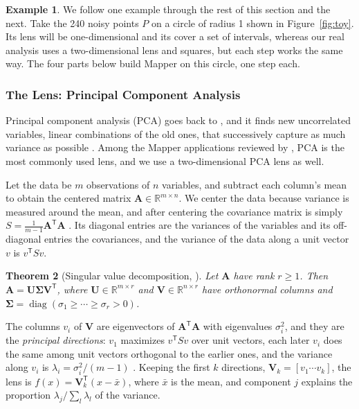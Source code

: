 \documentclass[11pt]{article}
\newcommand{\R}{\mathbb{R}}
\newtheorem{theorem}{Theorem}[section]
\theoremstyle{definition}
\newtheorem{example}[theorem]{Example}
\theoremstyle{remark}
\begin{document}
\begin{example}\label{ex:toy}
We follow one example through the rest of this section and the next.
Take the 240 noisy points $P$ on a circle of radius 1 shown in Figure~\ref{fig:toy}.
Its lens will be one-dimensional and its cover a set of intervals, whereas our real analysis uses a two-dimensional lens and squares, but each step works the same way.
The four parts below build Mapper on this circle, one step each.
\end{example}

\subsubsection{The Lens: Principal Component Analysis}
Principal component analysis (PCA) goes back to \textcite{pearson1901}, and it finds new uncorrelated variables, linear combinations of the old ones, that successively capture as much variance as possible \parencite{jolliffecadima2016}.
Among the Mapper applications reviewed by \textcite{madukpe2026review}, PCA is the most commonly used lens, and we use a two-dimensional PCA lens as well.

Let the data be $m$ observations of $n$ variables, and subtract each column's mean to obtain the centered matrix $\mathbf A \in \R^{m \times n}$.
We center the data because variance is measured around the mean, and after centering the covariance matrix is simply $S = \frac{1}{m-1}\mathbf A^{\mathsf T}\mathbf A$ \parencite{jolliffecadima2016}.
Its diagonal entries are the variances of the variables and its off-diagonal entries the covariances, and the variance of the data along a unit vector $v$ is $v^{\mathsf T} S v$.

\begin{theorem}[Singular value decomposition, {\cite{axler2024ladr}}]
Let $\mathbf A$ have rank $r \ge 1$. Then $\mathbf A = \mathbf U \boldsymbol\Sigma \mathbf V^{\mathsf T}$, where $\mathbf U \in \R^{m \times r}$ and $\mathbf V \in \R^{n \times r}$ have orthonormal columns and $\boldsymbol\Sigma = \operatorname{diag}(\sigma_1 \ge \cdots \ge \sigma_r > 0)$.
\end{theorem}
The columns $v_i$ of $\mathbf V$ are eigenvectors of $\mathbf A^{\mathsf T}\mathbf A$ with eigenvalues $\sigma_i^2$, and they are the \emph{principal directions}: $v_1$ maximizes $v^{\mathsf T} S v$ over unit vectors, each later $v_i$ does the same among unit vectors orthogonal to the earlier ones, and the variance along $v_i$ is $\lambda_i = \sigma_i^2/(m-1)$ \parencite{jolliffecadima2016}.
Keeping the first $k$ directions, $\mathbf V_k = [v_1 \cdots v_k]$, the lens is $f(x) = \mathbf V_k^{\mathsf T} (x - \bar x)$, where $\bar x$ is the mean, and component $j$ explains the proportion $\lambda_j / \sum_l \lambda_l$ of the variance.
\end{document}
